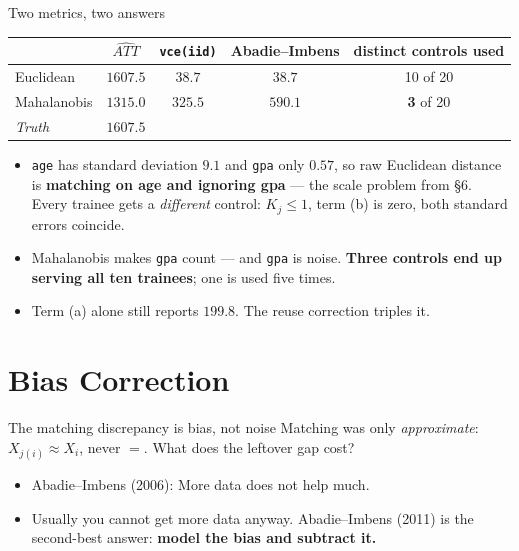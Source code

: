 \documentclass[
  11pt,
  ignorenonframetext,
  aspectratio=169,
]{beamer}
\providecommand{\tightlist}{%
  \setlength{\itemsep}{0pt}\setlength{\parskip}{0pt}}
\begin{document}
\begin{frame}[fragile]{Two metrics, two answers}
\protect{}\label{two-metrics-two-answers}
\begin{center}
\small
\begin{tabular}{lcccc}
\toprule
 & $\widehat{ATT}$ & \texttt{vce(iid)} & \textbf{Abadie--Imbens} & distinct controls used \\
\midrule
Euclidean    & $1607.5$ & $38.7$  & $38.7$  & 10 of 20 \\
Mahalanobis  & $1315.0$ & $325.5$ & $590.1$ & \textbf{3} of 20 \\
\midrule
\emph{Truth} & $1607.5$ & & & \\
\bottomrule
\end{tabular}
\end{center}

\begin{itemize}
\tightlist
\item
  \texttt{age} has standard deviation \(9.1\) and \texttt{gpa} only
  \(0.57\), so raw Euclidean distance is \textbf{matching on age and
  ignoring gpa} --- the scale problem from §6. Every trainee gets a
  \emph{different} control: \(K_j \leq 1\), term (b) is zero, both
  standard errors coincide.
\item
  Mahalanobis makes \texttt{gpa} count --- and \texttt{gpa} is noise.
  \textbf{Three controls end up serving all ten trainees}; one is used
  five times.
\item
  Term (a) alone still reports \(199.8\). The reuse correction triples
  it.
\end{itemize}
\end{frame}

\section{Bias Correction}\label{bias-correction}

\begin{frame}{The matching discrepancy is bias, not noise}
\protect{}\label{the-matching-discrepancy-is-bias-not-noise}
Matching was only \emph{approximate}: \(X_{j(i)} \approx X_i\), never
\(=\). What does the leftover gap cost?

\begin{itemize}
\tightlist
\item
  Abadie--Imbens (2006): More data does not help much.
\end{itemize}

\begin{itemize}
\tightlist
\item
  Usually you cannot get more data anyway. Abadie--Imbens (2011) is the
  second-best answer: \textbf{model the bias and subtract it.}
\end{itemize}
\end{frame}
\end{document}
